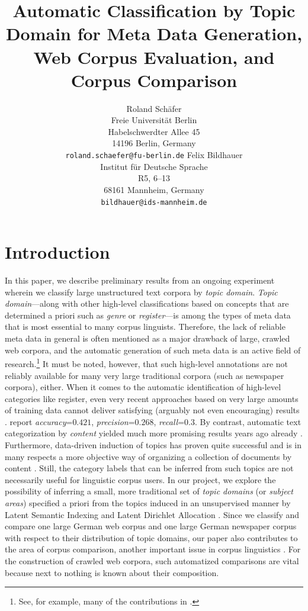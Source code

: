 \documentclass[11pt]{article}
\title{Automatic Classification by Topic Domain for Meta Data Generation, Web Corpus Evaluation, and Corpus Comparison}
\author{Roland Schäfer\\
	    Freie Universität Berlin\\
	    Habelschwerdter Allee 45\\
	    14196 Berlin, Germany\\
	    {\tt roland.schaefer@fu-berlin.de}
	  \And
	Felix Bildhauer\\
  	Institut für Deutsche Sprache\\
  	R5, 6--13\\
  	68161 Mannheim, Germany\\
  {\tt bildhauer@ids-mannheim.de}}
\date{}
\begin{document}
\maketitle


\section{Introduction}
\label{sec:introduction}

In this paper, we describe preliminary results from an ongoing experiment wherein we classify large unstructured text corpora by \textit{topic domain}.
\textit{Topic domain}---along with other high-level classifications based on concepts that are determined a priori such as \textit{genre} or \textit{register}---is among the types of meta data that is most essential to many corpus linguists.
Therefore, the lack of reliable meta data in general is often mentioned as a major drawback of large, crawled web corpora, and the automatic generation of such meta data is an active field of research.\footnote{See, for example, many of the contributions in .}
It must be noted, however, that such high-level annotations are not reliably available for many very large traditional corpora (such as newspaper corpora), either.
When it comes to the automatic identification of high-level categories like register, even very recent approaches based on very large amounts of training data cannot deliver satisfying (arguably not even encouraging) results \cite{BiberEgbert2016}.
 report \textit{accuracy}=$0.421$, \textit{precision}=$0.268$, \textit{recall}=$0.3$.
By contrast, automatic text categorization by \textit{content} yielded much more promising results years ago already \cite{Sebastiani2002}.
Furthermore, data-driven induction of topics has proven quite successful and is in many respects a more objective way of organizing a collection of documents by content \cite{Eagles1996}.
Still, the category labels that can be inferred from such topics are not necessarily useful for linguistic corpus users.
In our project, we explore the possibility of inferring a small, more traditional set of \textit{topic domains} (or \textit{subject areas}) specified a priori from the topics induced in an unsupervised manner by Latent Semantic Indexing \cite{LandauerDumais1994,LandauerDumais1997} and Latent Dirichlet Allocation \cite{BleiEa2003}.
Since we classify and compare one large German web corpus and one large German newspaper corpus with respect to their distribution of topic domains, our paper also contributes to the area of corpus comparison, another important issue in corpus linguistics \cite{Kilgarriff2001,BiemannEa2013}.
For the construction of crawled web corpora, such automatized comparisons are vital because next to nothing is known about their composition.
\end{document}
